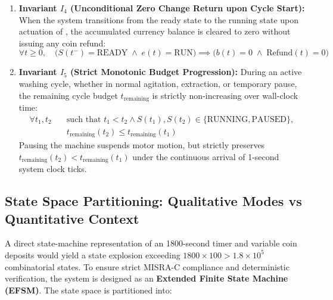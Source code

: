 \begin{enumerate}[leftmargin=*]
  \item \textbf{Invariant $I_4$ (Unconditional Zero Change Return upon Cycle Start):}
        When the system transitions from the ready state to the running state upon actuation of ,
        the accumulated currency balance is cleared to zero without issuing any coin refund:
        \begin{equation}
          \forall t \ge 0, \quad \Big(S(t^-) = \text{READY} \;\land\; e(t) = \text{RUN}\Big) \implies \Big(b(t) = 0 \;\land\; \text{Refund}(t) = 0\Big)
          \label{eq:inv4}
        \end{equation}

  \item \textbf{Invariant $I_5$ (Strict Monotonic Budget Progression):}
        During an active washing cycle, whether in normal agitation, extraction, or temporary pause,
        the remaining cycle budget $t_{\text{remaining}}$ is strictly non-increasing over wall-clock time:
        \begin{equation}
        \begin{split}
          \forall t_1, t_2 \quad & \text{such that } t_1 < t_2 \land S(t_1), S(t_2) \in \{\text{RUNNING}, \text{PAUSED}\}, \\
          & t_{\text{remaining}}(t_2) \le t_{\text{remaining}}(t_1)
        \end{split}
        \label{eq:inv5}
        \end{equation}
        Pausing the machine suspends motor motion, but strictly preserves $t_{\text{remaining}}(t_2) < t_{\text{remaining}}(t_1)$
        under the continuous arrival of 1-second system clock ticks.
\end{enumerate}

\subsection{State Space Partitioning: Qualitative Modes vs Quantitative Context}

A direct state-machine representation of an 1800-second timer and variable coin deposits would yield
a state explosion exceeding $1800 \times 100 > 1.8 \times 10^5$ combinatorial states. To ensure strict
MISRA-C compliance and deterministic verification, the system is designed as an \textbf{Extended Finite
State Machine (EFSM)}. The state space is partitioned into:

